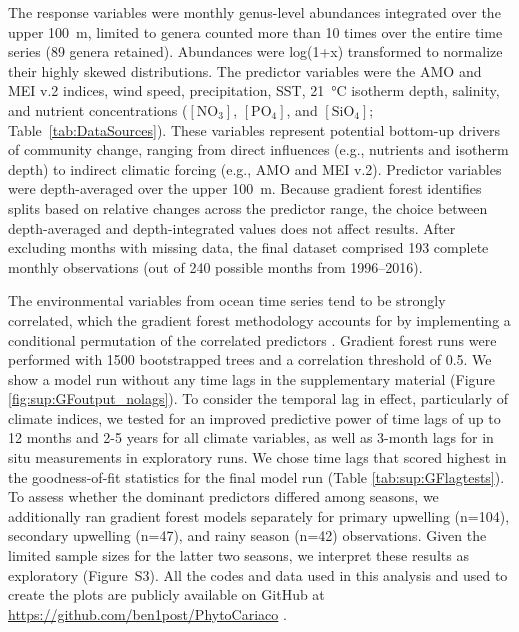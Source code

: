 \documentclass[]{agujournal2019}
\begin{document}
        The response variables were monthly genus-level abundances integrated over the upper \qty{100}{\meter}, limited to genera counted more than 10 times over the entire time series (89 genera retained). Abundances were log(1+x) transformed to normalize their highly skewed distributions. The predictor variables were the AMO and MEI v.2 indices, wind speed, precipitation, SST, \qty{21}{\celsius} isotherm depth, salinity, and nutrient concentrations ($\mathrm{[NO_3]}$, $\mathrm{[PO_4]}$, and $\mathrm{[SiO_4]}$; Table~\ref{tab:DataSources}). These variables represent potential bottom-up drivers of community change, ranging from direct influences (e.g., nutrients and isotherm depth) to indirect climatic forcing (e.g., AMO and MEI v.2). Predictor variables were depth-averaged over the upper \qty{100}{\meter}.  Because gradient forest identifies splits based on relative changes across the predictor range, the choice between depth-averaged and depth-integrated values does not affect results. After excluding months with missing data, the final dataset comprised 193 complete monthly observations (out of 240 possible months from 1996–2016).
        
        The environmental variables from ocean time series tend to be strongly correlated, which the gradient forest methodology accounts for by implementing a conditional permutation of the correlated predictors \cite{ellis_gradient_2012}. Gradient forest runs were performed with 1500 bootstrapped trees and a correlation threshold of 0.5.
        We show a model run without any time lags in the supplementary material (Figure \ref{fig:sup:GFoutput_nolags}). To consider the temporal lag in effect, particularly of climate indices, we tested for an improved predictive power of time lags of up to 12 months and 2-5 years for all climate variables, as well as 3-month lags for in situ measurements in exploratory runs. We chose time lags that scored highest in the goodness-of-fit statistics for the final model run (Table \ref{tab:sup:GFlagtests}).
        To assess whether the dominant predictors differed among seasons, we additionally ran gradient forest models separately for primary upwelling (n=104), secondary upwelling (n=47), and rainy season (n=42) observations. Given the limited sample sizes for the latter two seasons, we interpret these results as exploratory (Figure~S3).
        All the codes and data used in this analysis and used to create the plots are publicly available on GitHub at \url{https://github.com/ben1post/PhytoCariaco} \cite{benjamin_post_2026_18942210}.
\end{document}
